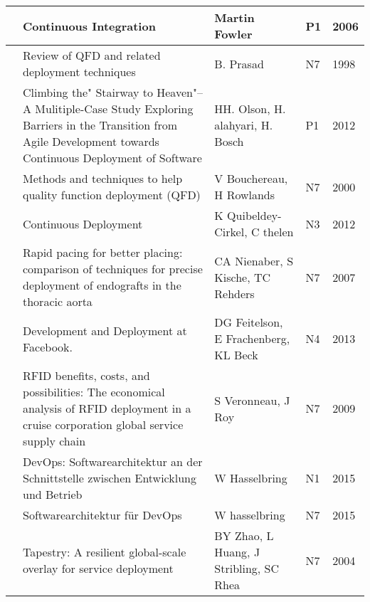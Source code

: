 \begin{landscape}
\begin{longtable}{|l|L{10cm}|L{10cm}|l|l|}
      & Continuous Integration & Martin Fowler & P1 & 2006 \\ \hline
    
     & Review of QFD and related deployment techniques & B. Prasad & N7 & 1998 \\ \hline
    
      & Climbing the" Stairway to Heaven"--A Mulitiple-Case Study Exploring Barriers in the Transition from Agile Development towards Continuous Deployment of Software & HH. Olson, H. alahyari, H. Bosch & P1 & 2012 \\ \hline
    
     & Methods and techniques to help quality function deployment (QFD) & V Bouchereau, H Rowlands & N7 & 2000 \\ \hline
    
     & Continuous Deployment & K Quibeldey-Cirkel, C thelen & N3 & 2012 \\ \hline
    
     & Rapid pacing for better placing: comparison of techniques for precise deployment of endografts in the thoracic aorta & CA Nienaber, S Kische, TC Rehders & N7 & 2007 \\ \hline
    
      & Development and Deployment at Facebook. & DG Feitelson, E Frachenberg, KL Beck & N4 & 2013 \\ \hline
    
     & RFID benefits, costs, and possibilities: The economical analysis of RFID deployment in a cruise corporation global service supply chain & S Veronneau, J Roy & N7 & 2009 \\ \hline
    
     &  DevOps: Softwarearchitektur an der Schnittstelle zwischen Entwicklung und Betrieb & W Hasselbring & N1 & 2015 \\ \hline
    
     & Softwarearchitektur für DevOps & W hasselbring & N7 & 2015 \\ \hline
    
      & Tapestry: A resilient global-scale overlay for service deployment
     & BY Zhao, L Huang, J Stribling, SC Rhea & N7 & 2004 \\ \hline
    

\end{longtable}
\end{landscape}

